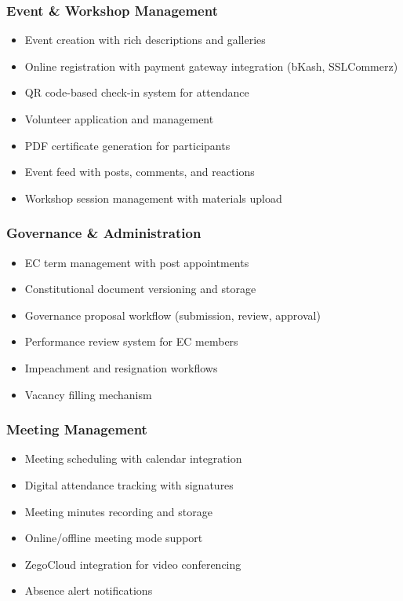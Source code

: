 \documentclass[12pt,a4paper]{article}
\begin{document}
\subsubsection{Event \& Workshop Management}
\begin{itemize}[noitemsep]
  \item Event creation with rich descriptions and galleries
  \item Online registration with payment gateway integration (bKash, SSLCommerz)
  \item QR code-based check-in system for attendance
  \item Volunteer application and management
  \item PDF certificate generation for participants
  \item Event feed with posts, comments, and reactions
  \item Workshop session management with materials upload
\end{itemize}

\subsubsection{Governance \& Administration}
\begin{itemize}[noitemsep]
  \item EC term management with post appointments
  \item Constitutional document versioning and storage
  \item Governance proposal workflow (submission, review, approval)
  \item Performance review system for EC members
  \item Impeachment and resignation workflows
  \item Vacancy filling mechanism
\end{itemize}

\subsubsection{Meeting Management}
\begin{itemize}[noitemsep]
  \item Meeting scheduling with calendar integration
  \item Digital attendance tracking with signatures
  \item Meeting minutes recording and storage
  \item Online/offline meeting mode support
  \item ZegoCloud integration for video conferencing
  \item Absence alert notifications
\end{itemize}
\end{document}
